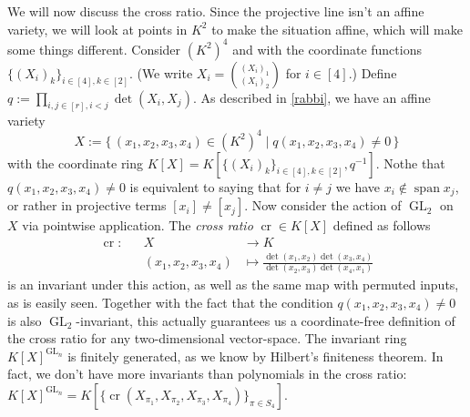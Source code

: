 \begin{example}
  We will now discuss the cross ratio.
  Since the projective line isn't an affine variety, we will look at points in $K^2$ to make the situation affine, which will make some things different.
  Consider $(K^2)^4$ and with the coordinate functions $\{(X_i)_k\}_{i \in [4], k \in [2]}$.
  (We write $X_i = \binom{(X_i)_1}{(X_i)_2}$ for $i \in [4]$.)
  Define $q := \prod_{i,j \in [r], i<j} \operatorname{det}(X_i,X_j)$.
  As described in \ref{rabbi}, we have an affine variety
  \begin{equation}
    X := \{\, (x_1,x_2,x_3,x_4) \in (K^2)^4 \mid q(x_1,x_2,x_3,x_4) \neq 0 \,\}
  \end{equation}
  with the coordinate ring $K[X] = K[\{(X_i)_k\}_{i \in [4], k \in [2]},q^{-1}]$.
  Nothe that $q(x_1,x_2,x_3,x_4) \neq 0$ is equivalent to saying that for $i\neq j$ we have $x_i \notin \operatorname{span}{x_j}$, or rather in projective terms $[x_i] \neq [x_j]$.
  Now consider the action of $\operatorname{GL}_2$ on $X$ via pointwise application.
  The \textit{cross ratio} $\operatorname{cr} \in K[X]$ defined as follows
  \begin{equation}
    \begin{aligned}
      \operatorname{cr} \colon&&X&\longrightarrow K \\
      &&(x_1,x_2,x_3,x_4) &\longmapsto \frac{\operatorname{det}(x_1,x_2)\operatorname{det}(x_3,x_4)}{\operatorname{det}(x_2,x_3)\operatorname{det}(x_4,x_1)}
    \end{aligned}
  \end{equation}
  is an invariant under this action, as well as the same map with permuted inputs, as is easily seen.
  Together with the fact that the condition $q(x_1,x_2,x_3,x_4) \neq 0$ is also $\operatorname{GL}_2$-invariant, this actually guarantees us a coordinate-free definition of the cross ratio for any two-dimensional vector-space.
  The invariant ring $K[X]^{\operatorname{GL}_n}$ is finitely generated, as we know by Hilbert's finiteness theorem.
  In fact, we don't have more invariants than polynomials in the cross ratio: $K[X]^{\operatorname{GL}_n} = K[\{\operatorname{cr}(X_{\pi_1},X_{\pi_2},X_{\pi_3},X_{\pi_4})\}_{\pi \in S_4}]$.

\end{example}
